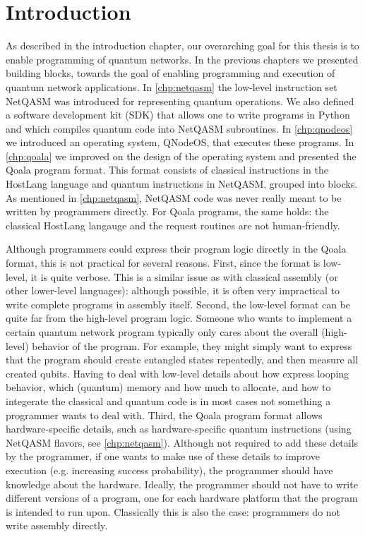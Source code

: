 \section{Introduction}
As described in the introduction chapter, our overarching goal for this thesis is to enable programming of quantum networks.
In the previous chapters we presented building blocks, towards the goal of enabling programming and execution of quantum network applications.
In \cref{chp:netqasm} the low-level instruction set NetQASM was introduced for representing quantum operations.
We also defined a software development kit (SDK) that allows one to write programs in Python and which compiles quantum code into NetQASM subroutines.
In \cref{chp:qnodeos} we introduced an operating system, QNodeOS, that executes these programs.
In \cref{chp:qoala} we improved on the design of the operating system and presented the Qoala program format.
This format consists of classical instructions in the HostLang language and quantum instructions in NetQASM, grouped into blocks.
As mentioned in \cref{chp:netqasm}, NetQASM code was never really meant to be written by programmers directly.
For Qoala programs, the same holds: the classical HostLang langauge and the request routines are not human-friendly.

Although programmers could express their program logic directly in the Qoala format, this is not practical for several reasons.
First, since the format is low-level, it is quite verbose.
This is a similar issue as with classical assembly (or other lower-level languages): although possible, it is often very impractical to write complete programs in assembly itself.
Second, the low-level format can be quite far from the high-level program logic.
Someone who wants to implement a certain quantum network program typically only cares about the overall (high-level) behavior of the program.
For example, they might simply want to express that the program should create entangled states repeatedly, and then measure all created qubits.
Having to deal with low-level details about how express looping behavior, which (quantum) memory and how much to allocate, and how to integerate the classical and quantum code
is in most cases not something a programmer wants to deal with. 
Third, the Qoala program format allows hardware-specific details, such as hardware-specific quantum instructions (using NetQASM flavors, see \cref{chp:netqasm}).
Although not required to add these details by the programmer, if one wants to make use of these details to improve execution (e.g. increasing success probability), the programmer should have knowledge about the hardware.
Ideally, the programmer should not have to write different versions of a program, one for each hardware platform that the program is intended to run upon.
Classically this is also the case: programmers do not write assembly directly.

